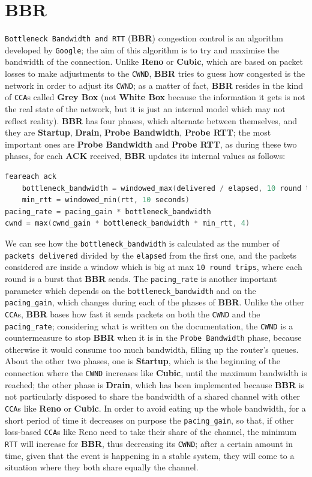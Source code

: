 \documentclass{exam}
\begin{document}
\section{BBR}
\texttt{Bottleneck Bandwidth and RTT} (\textbf{BBR}) congestion control is an algorithm developed by \texttt{Google}; the aim of this algorithm is to try and maximise the bandwidth of the connection. Unlike \textbf{Reno} or \textbf{Cubic}, which are based on packet losses to make adjustments to the \texttt{CWND}, \textbf{BBR} tries to guess how congested is the network in order to adjust its \texttt{CWND}; as a matter of fact, \textbf{BBR} resides in the kind of \texttt{CCA}s called \textbf{Grey Box} (not\textbf{ White Box} because the information it gets is not the real state of the network, but it is just an internal model which may not reflect reality). \textbf{BBR} has four phases, which alternate between themselves, and they are \textbf{Startup}, \textbf{Drain}, \textbf{Probe Bandwidth}, \textbf{Probe RTT}; the most important ones are \textbf{Probe Bandwidth} and \textbf{Probe RTT}, as during these two phases, for each \textbf{ACK} received, \textbf{BBR} updates its internal values as follows:
\begin{lstlisting}[language=c]
feareach ack
    bottleneck_bandwidth = windowed_max(delivered / elapsed, 10 round trips)
    min_rtt = windowed_min(rtt, 10 seconds)
pacing_rate = pacing_gain * bottleneck_bandwidth
cwnd = max(cwnd_gain * bottleneck_bandwidth * min_rtt, 4)
\end{lstlisting}
We can see how the \texttt{bottleneck\_bandwidth} is calculated as the number of \texttt{packets delivered} divided by the \texttt{elapsed} from the first one, and the packets considered are inside a window which is big at max \texttt{10 round trips}, where each round is a burst that \textbf{BBR} sends. The \texttt{pacing\_rate} is another important parameter which depends on the \texttt{bottleneck\_bandwidth} and on the \texttt{pacing\_gain}, which changes during each of the phases of \textbf{BBR}. Unlike the other \texttt{CCA}s, \textbf{BBR} bases how fast it sends packets on both the \texttt{CWND} and the \texttt{pacing\_rate}; considering what is written on the documentation, the \texttt{CWND} is a countermeasure to stop \textbf{BBR} when it is in the \texttt{Probe Bandwidth} phase, because otherwise it would consume too much bandwidth, filling up the router's queues. About the other two phases, one is \textbf{Startup}, which is the beginning of the connection where the \texttt{CWND} increases like \textbf{Cubic}, until the maximum bandwidth is reached; the other phase is \textbf{Drain}, which has been implemented because \textbf{BBR} is not particularly disposed to share the bandwidth of a shared channel with other \texttt{CCA}s like \textbf{Reno} or \textbf{Cubic}. In order to avoid eating up the whole bandwidth, for a short period of time it decreases on purpose the \texttt{pacing\_gain}, so that, if other loss-based \texttt{CCA}s like Reno need to take their share of the channel, the minimum \texttt{RTT} will increase for \textbf{BBR}, thus decreasing its \texttt{CWND}; after a certain amount in time, given that the event is happening in a stable system, they will come to a situation where they both share equally the channel.
\end{document}
